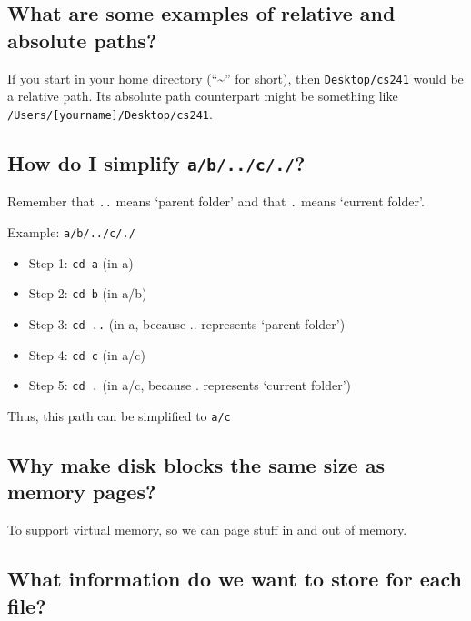 \subsection{What are some examples of relative and absolute
paths?}\label{what-are-some-examples-of-relative-and-absolute-paths}

If you start in your home directory (``\textasciitilde{}'' for short),
then \texttt{Desktop/cs241} would be a relative path. Its absolute path
counterpart might be something like
\texttt{/Users/{[}yourname{]}/Desktop/cs241}.

\subsection{\texorpdfstring{How do I simplify
\texttt{a/b/../c/./}?}{How do I simplify a/b/../c/./?}}\label{how-do-i-simplify-ab..c.}

Remember that \texttt{..} means `parent folder' and that \texttt{.}
means `current folder'.

Example: \texttt{a/b/../c/./}

\begin{itemize}
\itemsep1pt\parskip0pt
\item
  Step 1: \texttt{cd\ a} (in a)
\item
  Step 2: \texttt{cd\ b} (in a/b)
\item
  Step 3: \texttt{cd\ ..} (in a, because .. represents `parent folder')
\item
  Step 4: \texttt{cd\ c} (in a/c)
\item
  Step 5: \texttt{cd\ .} (in a/c, because . represents `current folder')
\end{itemize}

Thus, this path can be simplified to \texttt{a/c}

\subsection{Why make disk blocks the same size as memory
pages?}\label{why-make-disk-blocks-the-same-size-as-memory-pages}

To support virtual memory, so we can page stuff in and out of memory.

\subsection{What information do we want to store for each
file?}\label{what-information-do-we-want-to-store-for-each-file}

